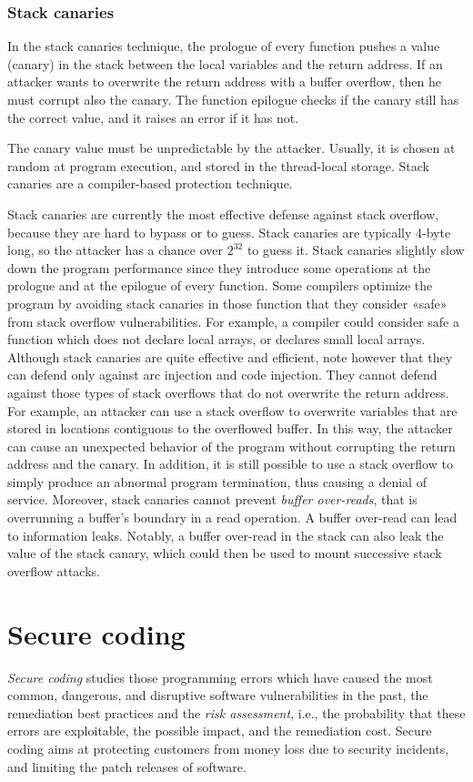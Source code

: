 \documentclass[a4paper,12pt]{article}
\begin{document}
\subsubsection{Stack canaries}
In the stack canaries technique, the prologue of every function pushes a value (canary) in the stack between the local variables and the return address. If an attacker wants to overwrite the return address with a buffer overflow, then he must corrupt also the canary. The function epilogue checks if the canary still has the correct value, and it raises an error if it has not.

The canary value must be unpredictable by the attacker. Usually, it is chosen at random at program execution, and stored in the thread-local storage. Stack canaries are a compiler-based protection technique.

Stack canaries are currently the most effective defense against stack overflow, because they are hard to bypass or to guess. Stack canaries are typically 4-byte long, so the attacker has a chance over $2^{32}$ to guess it. Stack canaries slightly slow down the program performance since they introduce some operations at the prologue and at the epilogue of every function. Some compilers optimize the program by avoiding stack canaries in those function that they consider «safe» from stack overflow vulnerabilities. For example, a compiler could consider safe a function which does not declare local arrays, or declares small local arrays.
Although stack canaries are quite effective and efficient, note however that they can defend only against arc injection and code injection. They cannot defend against those types of stack overflows that do not overwrite the return address. For example, an attacker can use a stack overflow to overwrite variables that are stored in locations contiguous to the overflowed buffer. In this way, the attacker can cause an unexpected behavior of the program without corrupting the return address and the canary. In addition, it is still possible to use a stack overflow to simply produce an abnormal program termination, thus causing a denial of service. Moreover, stack canaries cannot prevent \textit{buffer over-reads}, that is overrunning a buffer’s boundary in a read operation. A buffer over-read can lead to information leaks. Notably, a buffer over-read in the stack can also leak the value of the stack canary, which could then be used to mount successive stack overflow attacks.

\newpage

\section{Secure coding}
\textit{Secure coding} studies those programming errors which have caused the most common, dangerous, and disruptive software vulnerabilities in the past, the remediation best practices and the \textit{risk assessment}, i.e., the probability that these errors are exploitable, the possible impact, and the remediation cost. Secure coding aims at protecting customers from money loss due to security incidents, and limiting the patch releases of software.
\end{document}
